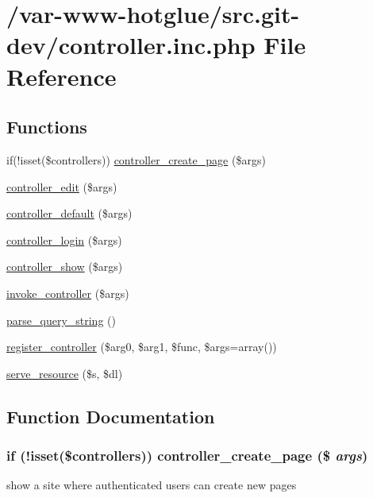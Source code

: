 \hypertarget{controller_8inc_8php}{
\section{/var-\/www-\/hotglue/src.git-\/dev/controller.inc.php File Reference}
\label{controller_8inc_8php}
}
\subsection*{Functions}
\begin{DoxyCompactItemize}
\item 
if(!isset(\$controllers)) \hyperlink{controller_8inc_8php_a647d96ea8304771250e8fa4251a4d12e}{controller\_\-create\_\-page} (\$args)
\item 
\hyperlink{controller_8inc_8php_a406fb5b2a2a93bef89e4ba46f8829d2f}{controller\_\-edit} (\$args)
\item 
\hyperlink{controller_8inc_8php_ae9c67435a37f4b70d0769079c9dbf379}{controller\_\-default} (\$args)
\item 
\hyperlink{controller_8inc_8php_ac3e283e26869e2ffd938bdf9775c3e81}{controller\_\-login} (\$args)
\item 
\hyperlink{controller_8inc_8php_ad135971740244b9e81718d4cd0407b11}{controller\_\-show} (\$args)
\item 
\hyperlink{controller_8inc_8php_a170bef82dc4636c51b678276323e4ff4}{invoke\_\-controller} (\$args)
\item 
\hyperlink{controller_8inc_8php_a51a50fbc5165b4ff0a289b2010bb7597}{parse\_\-query\_\-string} ()
\item 
\hyperlink{controller_8inc_8php_a543961dbcd309fa2cb6a887a8666bf1c}{register\_\-controller} (\$arg0, \$arg1, \$func, \$args=array())
\item 
\hyperlink{controller_8inc_8php_a5d5274c3531eb05a1ea5927ff3cd08d3}{serve\_\-resource} (\$s, \$dl)
\end{DoxyCompactItemize}


\subsection{Function Documentation}
\hypertarget{controller_8inc_8php_a647d96ea8304771250e8fa4251a4d12e}{
\subsubsection[{controller\_\-create\_\-page}]{\setlength{\rightskip}{0pt plus 5cm}if (!isset(\$controllers)) controller\_\-create\_\-page (\$ {\em args})}}
\label{controller_8inc_8php_a647d96ea8304771250e8fa4251a4d12e}
show a site where authenticated users can create new pages 

